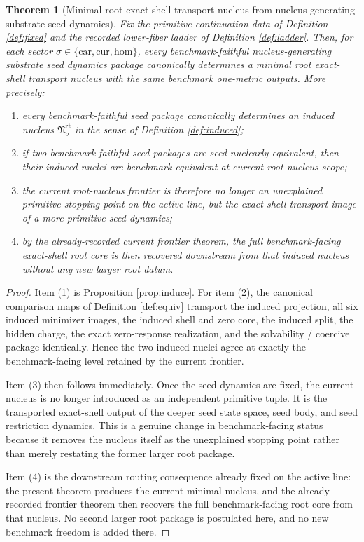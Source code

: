 \documentclass[11pt]{article}
\newcommand{\Car}{\mathrm{car}}
\newcommand{\Cur}{\mathrm{cur}}
\newcommand{\Hom}{\mathrm{hom}}
\newcommand{\RootNucleus}[1]{\mathfrak N_{#1}^{\mathrm{rt}}}
\newtheorem{theorem}{Theorem}
\begin{document}
\begin{theorem}[Minimal root exact-shell transport nucleus from nucleus-generating substrate seed dynamics]
\label{thm:main}
Fix the primitive continuation data of Definition \ref{def:fixed} and the recorded lower-fiber ladder of Definition \ref{def:ladder}. Then, for each sector \(\sigma\in\{\Car,\Cur,\Hom\}\), every benchmark-faithful nucleus-generating substrate seed dynamics package canonically determines a minimal root exact-shell transport nucleus with the same benchmark one-metric outputs. More precisely:
\begin{enumerate}
    \item every benchmark-faithful seed package canonically determines an induced nucleus \(\RootNucleus{\sigma}\) in the sense of Definition \ref{def:induced};
    \item if two benchmark-faithful seed packages are seed-nuclearly equivalent, then their induced nuclei are benchmark-equivalent at current root-nucleus scope;
    \item the current root-nucleus frontier is therefore no longer an unexplained primitive stopping point on the active line, but the exact-shell transport image of a more primitive seed dynamics;
    \item by the already-recorded current frontier theorem, the full benchmark-facing exact-shell root core is then recovered downstream from that induced nucleus without any new larger root datum.
\end{enumerate}
\end{theorem}

\begin{proof}
Item (1) is Proposition \ref{prop:induce}. For item (2), the canonical comparison maps of Definition \ref{def:equiv} transport the induced projection, all six induced minimizer images, the induced shell and zero core, the induced split, the hidden charge, the exact zero-response realization, and the solvability / coercive package identically. Hence the two induced nuclei agree at exactly the benchmark-facing level retained by the current frontier.

Item (3) then follows immediately. Once the seed dynamics are fixed, the current nucleus is no longer introduced as an independent primitive tuple. It is the transported exact-shell output of the deeper seed state space, seed body, and seed restriction dynamics. This is a genuine change in benchmark-facing status because it removes the nucleus itself as the unexplained stopping point rather than merely restating the former larger root package.

Item (4) is the downstream routing consequence already fixed on the active line: the present theorem produces the current minimal nucleus, and the already-recorded frontier theorem then recovers the full benchmark-facing root core from that nucleus. No second larger root package is postulated here, and no new benchmark freedom is added there.
\end{proof}
\end{document}
